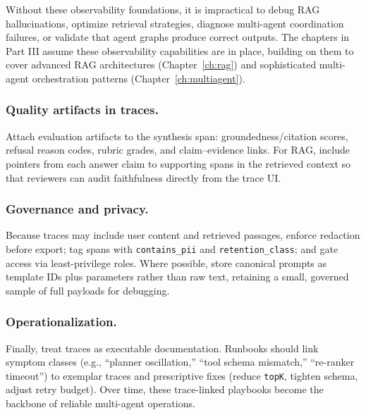 Without these observability foundations, it is impractical to debug RAG hallucinations, optimize retrieval strategies, diagnose multi-agent coordination failures, or validate that agent graphs produce correct outputs. The chapters in Part III assume these observability capabilities are in place, building on them to cover advanced RAG architectures (Chapter~\ref{ch:rag}) and sophisticated multi-agent orchestration patterns (Chapter~\ref{ch:multiagent}).

\subsubsection{Quality artifacts in traces.}
Attach evaluation artifacts to the synthesis span: groundedness/citation scores, refusal reason codes, rubric grades, and claim–evidence links. For RAG, include pointers from each answer claim to supporting spans in the retrieved context so that reviewers can audit faithfulness directly from the trace UI.

\subsubsection{Governance and privacy.}
Because traces may include user content and retrieved passages, enforce redaction before export; tag spans with \texttt{contains\_pii} and \texttt{retention\_class}; and gate access via least-privilege roles. Where possible, store canonical prompts as template IDs plus parameters rather than raw text, retaining a small, governed sample of full payloads for debugging.

\subsubsection{Operationalization.}
Finally, treat traces as executable documentation. Runbooks should link symptom classes (e.g., “planner oscillation,” “tool schema mismatch,” “re-ranker timeout”) to exemplar traces and prescriptive fixes (reduce \texttt{topK}, tighten schema, adjust retry budget). Over time, these trace-linked playbooks become the backbone of reliable multi-agent operations.

\medskip

